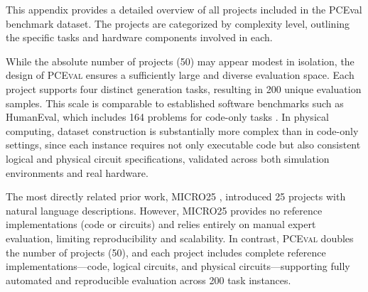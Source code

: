 \documentclass{article} %
\begin{document}
This appendix provides a detailed overview of all projects included in the PCEval benchmark dataset.
The projects are categorized by complexity level, outlining the specific tasks and hardware components involved in each.

While the absolute number of projects (50) may appear modest in isolation, the design of \textsc{PCEval} ensures a sufficiently large and diverse evaluation space. 
Each project supports four distinct generation tasks, resulting in 200 unique evaluation samples. 
This scale is comparable to established software benchmarks such as HumanEval, which includes 164 problems for code-only tasks \citep{chen2021evaluating}. 
In physical computing, dataset construction is substantially more complex than in code-only settings, since each instance requires not only executable code but also consistent logical and physical circuit specifications, validated across both simulation environments and real hardware.

The most directly related prior work, MICRO25 \citep{jansen2023words}, introduced 25 projects with natural language descriptions. 
However, MICRO25 provides no reference implementations (code or circuits) and relies entirely on manual expert evaluation, limiting reproducibility and scalability. 
In contrast, \textsc{PCEval} doubles the number of projects (50), and each project includes complete reference implementations—code, logical circuits, and physical circuits—supporting fully automated and reproducible evaluation across 200 task instances.
\end{document}
